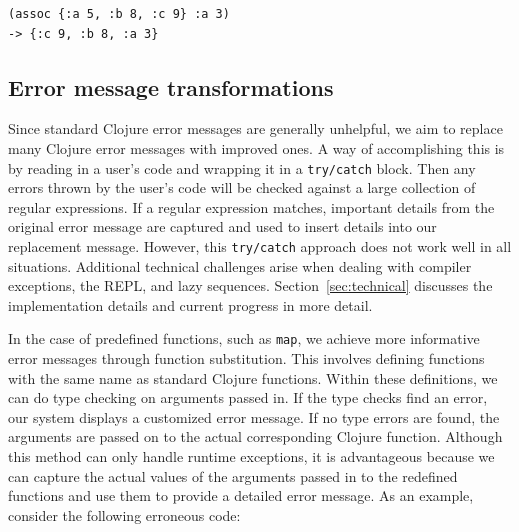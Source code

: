 \documentclass[12pt]{article}
\newcommand{\comment}[1]{{\bf \tt  {#1}}}
\newcommand{\emcomment}[1]{\textcolor{ForestGreen}{\comment{Elena: {#1}}}}
\begin{document}
\begin{verbatim}
(assoc {:a 5, :b 8, :c 9} :a 3)
-> {:c 9, :b 8, :a 3}
\end{verbatim}


\subsection{Error message transformations}\label{sec:transform}

Since standard Clojure error messages are generally unhelpful, we aim to replace many Clojure error messages with improved ones.
A way of accomplishing this is by reading in a user's code and wrapping it in a \texttt{try/catch} block.
Then any errors thrown by the user's code will be checked against a large collection of regular expressions.
If a regular expression matches, important details from the original error message are captured and used to insert details into our replacement message.
However, this \texttt{try/catch} approach does not work well in all situations.
Additional technical challenges arise when dealing with compiler exceptions, the REPL, and lazy sequences.
Section~\ref{sec:technical} discusses the implementation details and current progress in more detail.



In the case of predefined functions, such as \texttt{map}, we achieve more informative error messages through function substitution.
This involves defining functions with the same name as standard Clojure functions.
Within these definitions, we can do type checking on arguments passed in.
If the type checks find an error, our system displays a customized error message.
If no type errors are found, the arguments are passed on to the actual corresponding Clojure function.
Although this method can only handle runtime exceptions, it is advantageous because we can capture the actual values of the 
arguments passed in to the redefined functions and use them to provide a detailed error message. As an example, consider the following erroneous code:
\end{document}
